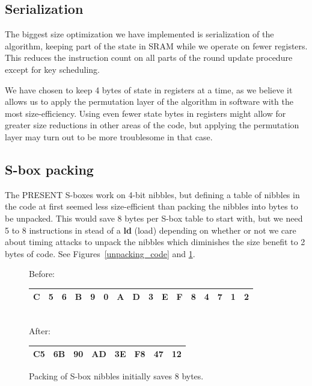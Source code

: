 \documentclass{llncs}
\begin{document}
\subsection{Serialization}
The biggest size optimization we have implemented is serialization of the algorithm, keeping part of the state in SRAM while we operate on fewer registers.
This reduces the instruction count on all parts of the round update procedure except for key scheduling.

We have chosen to keep 4 bytes of state in registers at a time, as we believe it allows us to apply the permutation layer of the algorithm in software with the most size-efficiency.
Using even fewer state bytes in registers might allow for greater size reductions in other areas of the code, but applying the permutation layer may turn out to be more troublesome in that case.

\subsection{S-box packing}
The PRESENT S-boxes work on 4-bit nibbles, but defining a table of nibbles in the code at first seemed less size-efficient than packing the nibbles into bytes to be unpacked.
This would save 8 bytes per S-box table to start with, but we need 5 to 8 instructions in stead of a \textbf{ld} (load) depending on whether or not we care about timing attacks to unpack the nibbles which diminishes the size benefit to 2 bytes of code. See Figures~\ref{unpacking_code} and \ref{packed_sbox}.

\begin{figure}
	Before: \\
	\begin{tabular}{ | c | c | c | c | c | c | c | c | c | c | c | c | c | c | c | c | }
	  \hline                        
	  C & 5 & 6 & B & 9 & 0 & A & D & 3 & E & F & 8 & 4 & 7 & 1 & 2 \\
	  \hline  
	\end{tabular}
	\\

	After: \\
	\begin{tabular}{ | c | c | c | c | c | c | c | c | }
	  \hline                        
	  C5 & 6B & 90 & AD & 3E & F8 & 47 & 12 \\
	  \hline  
	\end{tabular}
	\caption{Packing of S-box nibbles initially saves 8 bytes.}
	\label{packed_sbox}
\end{figure}
\end{document}
